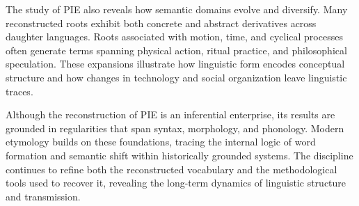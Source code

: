 \begin{historical}
The study of PIE also reveals how semantic domains evolve and diversify. Many reconstructed roots exhibit both concrete and abstract derivatives across daughter languages. Roots associated with motion, time, and cyclical processes often generate terms spanning physical action, ritual practice, and philosophical speculation. These expansions illustrate how linguistic form encodes conceptual structure and how changes in technology and social organization leave linguistic traces.

Although the reconstruction of PIE is an inferential enterprise, its results are grounded in regularities that span syntax, morphology, and phonology. Modern etymology builds on these foundations, tracing the internal logic of word formation and semantic shift within historically grounded systems. The discipline continues to refine both the reconstructed vocabulary and the methodological tools used to recover it, revealing the long-term dynamics of linguistic structure and transmission.
\end{historical}
